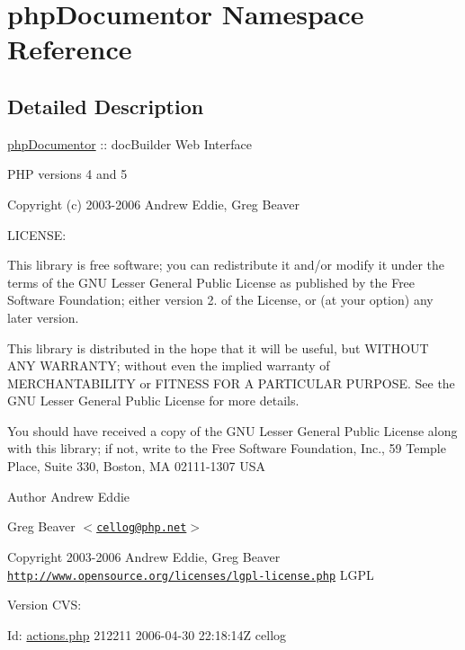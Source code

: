 \hypertarget{namespacephp_documentor}{\section{php\-Documentor \-Namespace \-Reference}
\label{namespacephp_documentor}
}


\subsection{\-Detailed \-Description}
\hyperlink{namespacephp_documentor}{php\-Documentor} \-:\-: doc\-Builder \-Web \-Interface

\-P\-H\-P versions 4 and 5

\-Copyright (c) 2003-\/2006 \-Andrew \-Eddie, \-Greg \-Beaver

\-L\-I\-C\-E\-N\-S\-E\-:

\-This library is free software; you can redistribute it and/or modify it under the terms of the \-G\-N\-U \-Lesser \-General \-Public \-License as published by the \-Free \-Software \-Foundation; either version 2. of the \-License, or (at your option) any later version.

\-This library is distributed in the hope that it will be useful, but \-W\-I\-T\-H\-O\-U\-T \-A\-N\-Y \-W\-A\-R\-R\-A\-N\-T\-Y; without even the implied warranty of \-M\-E\-R\-C\-H\-A\-N\-T\-A\-B\-I\-L\-I\-T\-Y or \-F\-I\-T\-N\-E\-S\-S \-F\-O\-R \-A \-P\-A\-R\-T\-I\-C\-U\-L\-A\-R \-P\-U\-R\-P\-O\-S\-E. \-See the \-G\-N\-U \-Lesser \-General \-Public \-License for more details.

\-You should have received a copy of the \-G\-N\-U \-Lesser \-General \-Public \-License along with this library; if not, write to the \-Free \-Software \-Foundation, \-Inc., 59 \-Temple \-Place, \-Suite 330, \-Boston, \-M\-A 02111-\/1307 \-U\-S\-A

\begin{DoxyAuthor}{\-Author}
\-Andrew \-Eddie 

\-Greg \-Beaver $<$\href{mailto:cellog@php.net}{\tt cellog@php.\-net}$>$ 
\end{DoxyAuthor}
\begin{DoxyCopyright}{\-Copyright}
2003-\/2006 \-Andrew \-Eddie, \-Greg \-Beaver  \href{http://www.opensource.org/licenses/lgpl-license.php}{\tt http\-://www.\-opensource.\-org/licenses/lgpl-\/license.\-php} \-L\-G\-P\-L 
\end{DoxyCopyright}
\begin{DoxyVersion}{\-Version}
\-C\-V\-S\-: 
\end{DoxyVersion}
\begin{DoxyParagraph}{\-Id\-:}
\hyperlink{actions_8php}{actions.\-php} 212211 2006-\/04-\/30 22\-:18\-:14\-Z cellog 
\end{DoxyParagraph}


